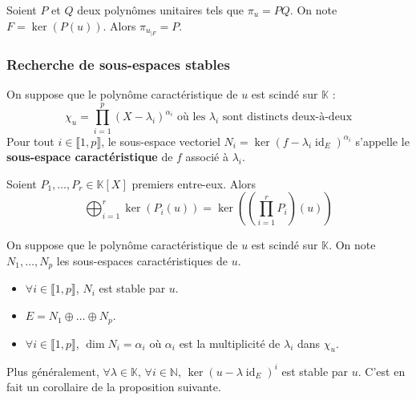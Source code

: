	\begin{proposition}
		Soient $P$ et $Q$ deux polynômes unitaires tels que $\pi_u = PQ$. On note $F = \ker{(P(u))}$. Alors $\pi_{u_{|F}} = P$.
	\end{proposition}
	
	\subsubsection{Recherche de sous-espaces stables}
	
	
	\begin{definition}
		On suppose que le polynôme caractéristique de $u$ est scindé sur $\mathbb{K}$ :
		\[ \chi_u = \prod_{i=1}^p (X - \lambda_i)^{\alpha_i} \text{ où les } \lambda_i \text{ sont distincts deux-à-deux} \]
		Pour tout $i \in \llbracket 1, p \rrbracket$, le sous-espace vectoriel $N_i = \ker{(f - \lambda_i \operatorname{id}_E)^{\alpha_i}}$ s'appelle le \textbf{sous-espace caractéristique} de $f$ associé à $\lambda_i$.
	\end{definition}
	
	
	\begin{proposition}
		Soient $P_1, \dots, P_r \in \mathbb{K}[X]$ premiers entre-eux. Alors
		\[ \bigoplus_{i=1}^r \ker{(P_i(u))} = \ker \left( \left( \prod_{i=1}^r P_i \right) \left ( u \right) \right) \]
	\end{proposition}
	
	
	\begin{proposition}
		On suppose que le polynôme caractéristique de $u$ est scindé sur $\mathbb{K}$. On note $N_1, \dots, N_p$ les sous-espaces caractéristiques de $u$.
		\begin{itemize}
			\item $\forall i \in \llbracket 1, p \rrbracket$, $N_i$ est stable par $u$.
			\item $E = N_1 \oplus \dots \oplus N_p$.
			\item $\forall i \in \llbracket 1, p \rrbracket$, $\dim{N_i} = \alpha_i$ où $\alpha_i$ est la multiplicité de $\lambda_i$ dans $\chi_u$.
		\end{itemize}
	\end{proposition}
	
	
	\begin{remark}
		Plus généralement, $\forall \lambda \in \mathbb{K}, \, \forall i \in \mathbb{N}, \, \ker{(u - \lambda \operatorname{id}_E)^i}$ est stable par $u$. C'est en fait un corollaire de la proposition suivante.
	\end{remark}
	
